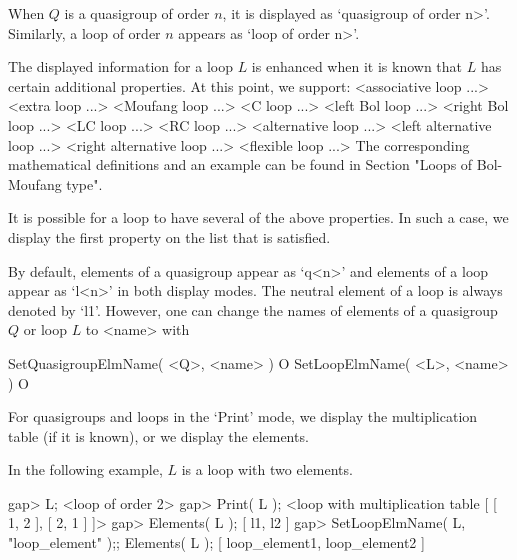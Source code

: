 When $Q$ is a quasigroup of order $n$, it is displayed as `\<quasigroup of
order n>'. Similarly, a loop of order $n$ appears as `\<loop of order n>'.

The displayed information for a loop $L$ is enhanced when it is known that $L$
has certain additional properties. At this point, we support:
\begintt
    <associative loop ...>
    <extra loop ...>
    <Moufang loop ...>
    <C loop ...>
    <left Bol loop ...>
    <right Bol loop ...>
    <LC loop ...>
    <RC loop ...>
    <alternative loop ...>
    <left alternative loop ...>
    <right alternative loop ...>
    <flexible loop ...>
\endtt
The corresponding mathematical definitions and an example can be found in
Section "Loops of Bol-Moufang type".

It is possible for a loop to have several of the above properties. In such a
case, we display the first property on the list that is satisfied.

By default, elements of a quasigroup appear as `q<n>' and elements of a loop
appear as `l<n>' in both display modes. The neutral element of a loop is always
denoted by `l1'. However, one can change the names of elements of a quasigroup
$Q$ or loop $L$ to <name> with

\>SetQuasigroupElmName( <Q>, <name> ) O
\>SetLoopElmName( <L>, <name> ) O

For quasigroups and loops in the `Print' mode, we display the multiplication
table (if it is known), or we display the elements.

In the following example, $L$ is a loop with two elements.

\beginexample
gap> L;
<loop of order 2>
gap> Print( L );
<loop with multiplication table [ [ 1,  2 ], [  2,  1 ] ]>
gap> Elements( L );
[ l1, l2 ]
gap> SetLoopElmName( L, "loop_element" );; Elements( L );
[ loop_element1, loop_element2 ]
\endexample
